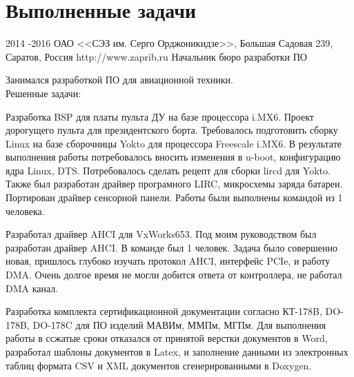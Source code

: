 \section{Выполненные задачи}

\job
{2014 -}{2016}
{ОАО <<СЭЗ им. Серго Орджоникидзе>>, Большая Садовая 239, Саратов, Россия}
{http://www.zaprib.ru}
{Начальник бюро разработки ПО}
{Занимался разработкой ПО для авиационной техники.\\

Решенные задачи:
\begin{itemize-noindent}
\item{Разработка BSP для платы пульта ДУ на базе процессора i.MX6. Проект дорогущего пульта для президентского борта. Требовалось подготовить сборку Linux на базе сборочницы Yokto для процессора Freescale i.MX6. В результате выполнения работы потребовалось вносить изменения в u-boot, конфигурацию ядра Linux, DTS. Потребовалось сделать рецепт для сборки lircd для Yokto. Также был разработан драйвер програмного LIRC, микросхемы заряда батареи. Портирован драйвер сенсорной панели. Работы были выполнены командой из 1 человека.}
\item{Разработал драйвер AHCI для VxWorks653. Под моим руководством был разработан драйвер AHCI. В команде был 1 человек. Задача было совершенно новая, пришлось глубоко изучать протокол AHCI, интерфейс PCIe, и работу DMA. Очень долгое время не могли добится ответа от контроллера, не работал DMA канал.}
\item{Разработка комплекта сертификационной документации согласно КТ-178B, DO-178B, DO-178C для ПО изделий МАВИм, ММПм, МГПм. Для выполнения работы в ссжатые сроки отказался от принятой верстки документов в Word, разработал шаблоны документов в Latex, и заполнение данными из электронных таблиц формата CSV и XML документов сгенерированными в Doxygen.}
\end{itemize-noindent}
}



